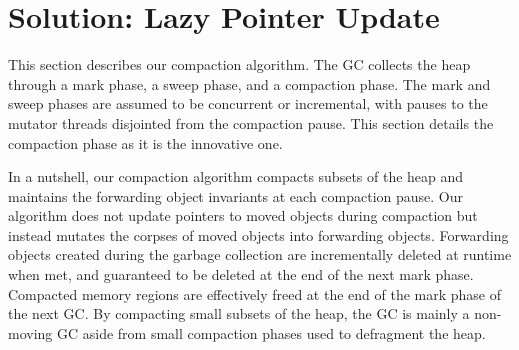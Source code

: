 \documentclass[sigplan,10pt,review,anonymous]{acmart}\settopmatter{printfolios=true,printccs=false,printacmref=false}
\begin{document}
%


\section{Solution: Lazy Pointer Update}
\label{sec:solution}

This section describes our compaction algorithm. The GC collects the heap through a mark phase, a sweep phase, and a compaction phase. The mark and sweep phases are assumed to be concurrent or incremental, with pauses to the mutator threads disjointed from the compaction pause.
This section details the compaction phase as it is the innovative one.

In a nutshell, our compaction algorithm compacts subsets of the heap and maintains the forwarding object invariants at each compaction pause. 
Our algorithm does not update pointers to moved objects during compaction but instead mutates the corpses of moved objects into forwarding objects. Forwarding objects created during the garbage collection are incrementally deleted at runtime when met, and guaranteed to be deleted at the end of the next mark phase. Compacted memory regions are effectively freed at the end of the mark phase of the next GC. By compacting small subsets of the heap, the GC is mainly a non-moving GC aside from small compaction phases used to defragment the heap.
\end{document}
